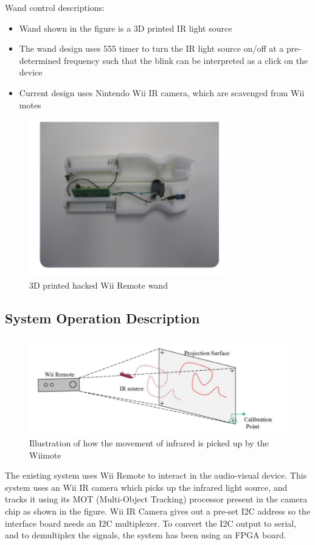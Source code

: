 \documentclass[12pt, a4paper]{article}
\begin{document}
\newpage

Wand control descriptions:
\begin{itemize}
\item Wand shown in the figure is a 3D printed IR light source
\item The wand design uses 555 timer to turn the IR light source on/off at a pre-determined frequency such that the blink can be interpreted as a click on the device
\item Current design uses Nintendo Wii IR camera, which are scavenged from Wii motes
\end{itemize}

\begin{figure}[htp]
\centering
\includegraphics[scale=0.4]{wand1.png}
\caption{3D printed hacked Wii Remote wand}
\label{}
\end{figure}

\subsection{System Operation Description}
\begin{figure}[htp]
\centering
\includegraphics[scale=0.35]{wiiiii.png}
\caption{Illustration of how the movement of infrared is picked up by the Wiimote}
\label{}
\end{figure}

The existing system uses Wii Remote to interact in the audio-visual device. This system uses an Wii IR camera which picks up the infrared light source, and tracks it using its MOT (Multi-Object Tracking) processor present in the camera chip as shown in the figure. Wii IR Camera gives out a pre-set I2C address so the interface board needs an I2C multiplexer. To convert the I2C output to serial, and to demultiplex the signals, the system has been using an FPGA board. 
\end{document}
